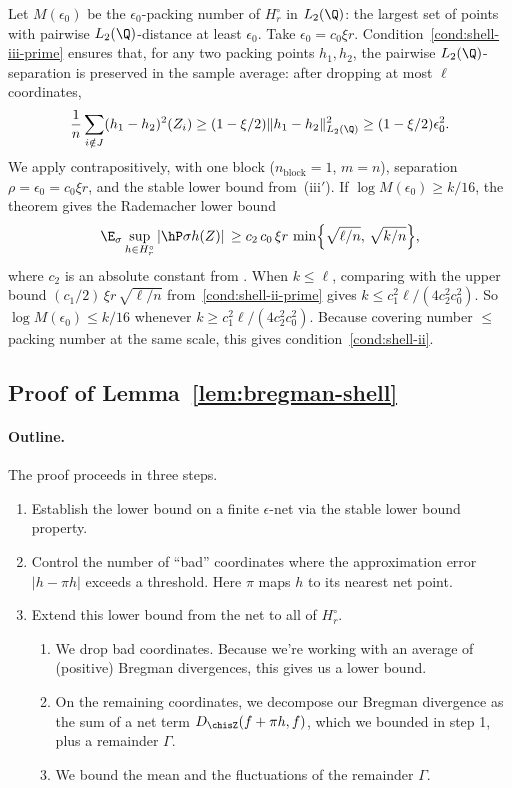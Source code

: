\documentclass{article}
\begin{document}
Let $M(\epsilon_0)$ be the $\epsilon_0$-packing number of $H_r^\circ$ in $L_2(\Q)$: the largest set of points with pairwise $L_2(\Q)$-distance at least $\epsilon_0$. Take $\epsilon_0 = c_0 \xi r$. Condition~\ref{cond:shell-iii-prime} ensures that, for any two packing points $h_1, h_2$, the pairwise $L_2(\Q)$-separation is preserved in the sample average: after dropping at most $\ell$ coordinates,
\[
\frac{1}{n}\sum_{i \notin J} (h_1 - h_2)^2(Z_i) \ge (1-\xi/2)\|h_1 - h_2\|_{L_2(\Q)}^2 \ge (1-\xi/2)\epsilon_0^2.
\]
We apply \citet[Theorem~4.4]{mendelson2021extending}
contrapositively,
with one block ($n_{\mathrm{block}} = 1$, $m = n$),
separation $\rho = \epsilon_0 = c_0\xi r$,
and the stable lower bound from~(iii$'$).
If $\log M(\epsilon_0) \ge k/16$,
the theorem gives the Rademacher lower bound
\[
\E_\sigma \sup_{h \in H_r^\circ}
  \abs*{\hP \sigma h(Z)}
\ge c_2\, c_0\, \xi r\, \min\!\qty{\sqrt{\ell/n},\, \sqrt{k/n}},
\]
where $c_2$ is an absolute constant
from \citet[Theorem~4.4]{mendelson2021extending}.
When $k \le \ell$,
comparing with the upper bound
$(c_1/2)\,\xi r\,\sqrt{\ell/n}$ from~\ref{cond:shell-ii-prime}
gives $k \le c_1^2 \ell / (4 c_2^2 c_0^2)$.
So $\log M(\epsilon_0) \le k/16$
whenever $k \ge c_1^2 \ell / (4 c_2^2 c_0^2)$.
Because covering number $\le$ packing number
at the same scale,
this gives condition~\ref{cond:shell-ii}.

\subsection{Proof of Lemma~\ref{lem:bregman-shell}}
\label{sec:proof-main}

\paragraph{Outline.}
The proof proceeds in three steps.
\begin{enumerate}
\item Establish the lower bound on a finite $\epsilon$-net via the stable lower bound property.
\item Control the number of ``bad'' coordinates where the approximation error $|h - \pi h|$ exceeds a threshold. Here $\pi$ maps $h$ to its nearest net point.
\item Extend this lower bound from the net to all of $H_r^\circ$.
\begin{enumerate}
  \item We drop bad coordinates. Because we're working with an average of (positive) Bregman divergences, this gives us a lower bound.
  \item On the remaining coordinates, we decompose our Bregman divergence as the sum of a net term $D_{\chisZ}(f+\pi h, f)$, which we bounded in step 1, plus a remainder $\Gamma$.
  \item  We bound the mean and the fluctuations of the remainder $\Gamma$.
\end{enumerate}
\end{enumerate}
\end{document}
